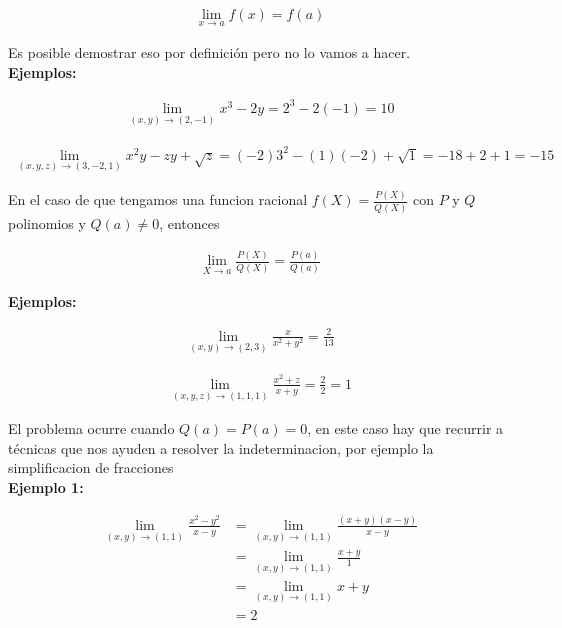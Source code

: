 \documentclass{article}
\theoremstyle{definition}
\begin{document}
\begin{align*}
\displaystyle \lim_{x \to a} f(x) = f(a)
\end{align*}

Es posible demostrar eso por definición pero no lo vamos a hacer. \\


\textbf{Ejemplos: } 



\begin{align*}
\displaystyle \lim_{(x,y) \to (2,-1)} x^3-2y = 2^3-2(-1) =10
\end{align*}



\begin{align*}
\displaystyle \lim_{(x,y,z) \to (3,-2,1)} x^2y-zy+\sqrt{z} = (-2)3^2-(1)(-2)+\sqrt{1} = -18+2+1=-15
\end{align*}


En el caso de que tengamos una funcion racional $f(X) = \displaystyle \frac{P(X)}{Q(X)}$ con $P$ y $Q$ polinomios y $Q(a) \neq 0$, entonces



\begin{align*}
\displaystyle \lim_{X \to a} \displaystyle \frac{P(X)}{Q(X)} = \displaystyle \frac{P(a)}{Q(a)}
\end{align*}


\textbf{Ejemplos: } 



\begin{align*}
\displaystyle \lim_{(x,y) \to (2,3)} \frac{x}{x^2+y^2} = \frac{2}{13}
\end{align*}



\begin{align*}
\displaystyle \lim_{(x,y,z) \to (1,1,1)} \frac{x^2+z}{x+y} = \frac{2}{2} = 1
\end{align*}



El problema ocurre cuando $Q(a) =P(a)= 0$, en este caso hay que recurrir a t\'ecnicas que nos ayuden a resolver la indeterminacion, por ejemplo la simplificacion de fracciones \\



\textbf{Ejemplo 1: } 



\begin{align*}
\displaystyle \lim_{(x,y) \to (1,1)} \frac{x^2-y^2}{x-y} &= \lim_{(x,y) \to (1,1)} \frac{(x+y)(x-y)}{x-y} \\
&= \lim_{(x,y) \to (1,1)} \frac{x+y}{1} \\
&= \lim_{(x,y) \to (1,1)} x+y \\
&= 2
\end{align*}
\end{document}
